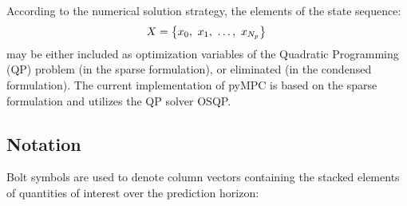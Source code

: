 \documentclass[a4paper,12pt,fleqn]{article}
\newcommand{\varx}{{X}}
\newcommand{\Np}{{N_p}}
\begin{document}
According to the numerical solution strategy, the elements of the state sequence:
\begin{equation}
  \varx  = \left\{ x_0,\ x_1,\ \dots, \ x_{\Np} \right \}\\ 
\end{equation}
may be either included as optimization variables of the Quadratic Programming (QP) problem (in the sparse formulation), or eliminated (in the condensed formulation). The current implementation of pyMPC is based on the sparse formulation and utilizes the QP solver OSQP. 

\subsection{Notation}
Bolt symbols are used to denote column vectors containing the stacked elements of quantities of interest over the prediction horizon:
\end{document}
